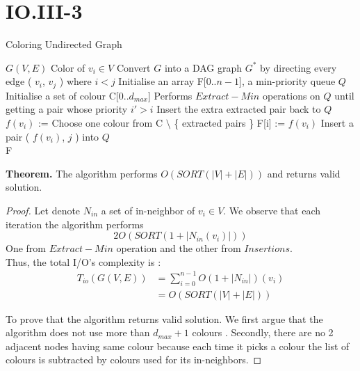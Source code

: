 \section*{IO.III-3}

\begin{algorithm}
  \caption{Coloring Undirected Graph}
  \label{alg:global_minimum}
  \begin{algorithmic}
    \renewcommand{\algorithmicrequire}{\textbf{Input:}}
    \renewcommand{\algorithmicensure}{\textbf{Output:}}
    \algnewcommand{}
    \algnewcommand\Operation{\item[\algorithmicoperation]}
    \Require $G( V, E )$
    \Ensure Color of $v_i \in V$
    \Operation
    \State Convert $G$ into a DAG graph $G^*$ by directing every edge ( $v_i$, $v_j$ ) where $i < j$
    \State Initialise an array F[0..$n-1$], a min-priority queue $Q$
    \State Initialise a set of colour C[0..$d_{max}$]
    	\State Performs $Extract-Min$ operations on $Q$ until getting a pair whose priority $i' > i$
	\State Insert the extra extracted pair back to $Q$
	\State $f(v_i)$ := Choose one colour from C $\setminus$ \{ extracted pairs \}
	\State F[i] := $f(v_i)$
	        \State Insert a pair ( $f(v_i)$, $j$ ) into $Q$
	   \EndFor
    \EndFor \\
    \Return F
  \end{algorithmic}
\end{algorithm}
\textbf{Theorem.} The algorithm performs $O( SORT(|V|+|E|) )$ and returns valid solution.

\begin{proof}
    Let denote $N_{in}$ a set of in-neighbor of $v_i \in V$. We observe that each iteration the algorithm performs
    $$2O( SORT(1 + |N_{in}(v_i)| ))$$
One from $Extract-Min$ operation and the other from $Insertions$. \\
Thus, the total I/O's complexity  is :
\begin{align*}
    T_{io}(G(V,E)) &= \sum^{n-1}_{i=0}{O( 1 + |N_{in}|)(v_i)} \\
    &= O( SORT( |V|+|E| ))
\end{align*}

To prove that the algorithm returns valid solution. We first argue that the algorithm does not use more than $d_{max} + 1 $ colours .
Secondly, there are no 2 adjacent nodes having same colour because each time it picks a colour the list of colours is subtracted by colours used for its in-neighbors.

\end{proof}
